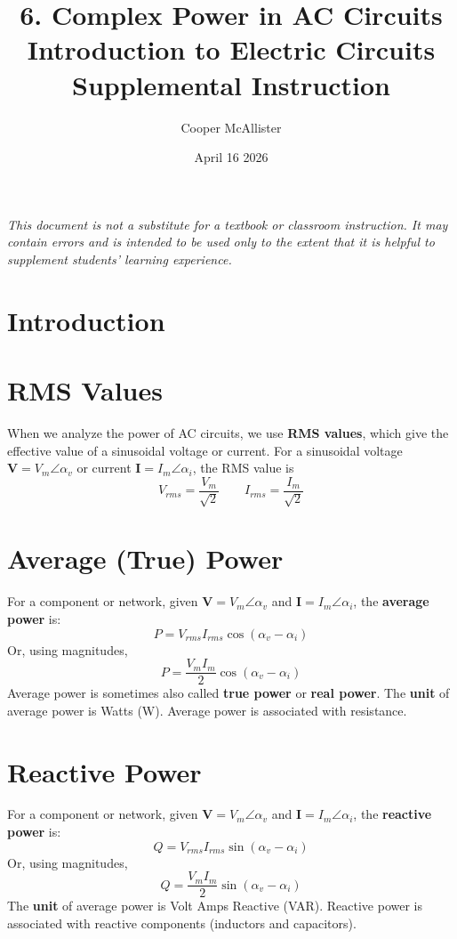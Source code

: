 \documentclass{article}
\title{6. Complex Power in AC Circuits \\  \large Introduction to Electric Circuits \\ Supplemental Instruction}
\author{Cooper McAllister}
\date{April 16 2026}
\begin{document}
 {
	\fancyhf{}
	\renewcommand{\headrulewidth}{0pt}
	\renewcommand{\footrulewidth}{0.4pt}
	\fancyfoot[R]{\thepage}
}
\pagestyle{footerstyle}
\maketitle
\thispagestyle{footerstyle}

\begin{center}
\textit{This document is not a substitute for a textbook or classroom instruction. It may contain errors and is intended to be used only to the extent that it is helpful to supplement students' learning experience.}
\end{center}

\section{Introduction}


\section{RMS Values}
When we analyze the power of AC circuits, we use \textbf{RMS values}, which give the effective value of a sinusoidal voltage or current. For a sinusoidal voltage $\bm{V} = V_m \angle \alpha_v$ or current $\bm{I} = I_m \angle \alpha_i$, the RMS value is
$$V_{rms} = \frac{V_m}{\sqrt{2}} \qquad I_{rms} = \frac{I_m}{\sqrt{2}}$$


\section{Average (True) Power}
For a component or network, given $\bm{V} = V_m \angle \alpha_v$ and $\bm{I} = I_m \angle \alpha_i$, the \textbf{average power} is:
$$P = V_{rms}I_{rms}\cos(\alpha_v - \alpha_i)$$
Or, using magnitudes,
$$P = \frac{V_mI_m}{2}\cos(\alpha_v - \alpha_i)$$
Average power is sometimes also called \textbf{true power} or \textbf{real power}. The \textbf{unit} of average power is Watts (W). Average power is associated with resistance.

\section{Reactive Power}
For a component or network, given $\bm{V} = V_m \angle \alpha_v$ and $\bm{I} = I_m \angle \alpha_i$, the \textbf{reactive power} is:
$$Q = V_{rms}I_{rms}\sin(\alpha_v - \alpha_i)$$
Or, using magnitudes,
$$Q = \frac{V_mI_m}{2}\sin(\alpha_v - \alpha_i)$$
The \textbf{unit} of average power is Volt Amps Reactive (VAR). Reactive power is associated with reactive components (inductors and capacitors).
\end{document}
